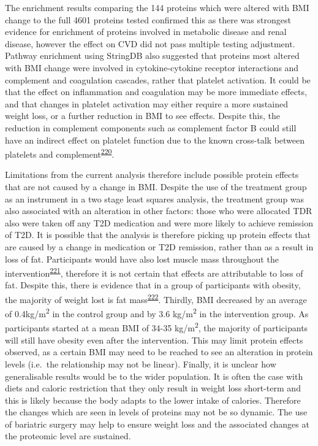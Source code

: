\documentclass[11pt,twoside]{bristolthesis}
\begin{document}
The enrichment results comparing the 144 proteins which were altered with BMI change to the full 4601 proteins tested confirmed this as there was strongest evidence for enrichment of proteins involved in metabolic disease and renal disease, however the effect on CVD did not pass multiple testing adjustment. Pathway enrichment using StringDB also suggested that proteins most altered with BMI change were involved in cytokine-cytokine receptor interactions and complement and coagulation cascades, rather that platelet activation. It could be that the effect on inflammation and coagulation may be more immediate effects, and that changes in platelet activation may either require a more sustained weight loss, or a further reduction in BMI to see effects. Despite this, the reduction in complement components such as complement factor B could still have an indirect effect on platelet function due to the known cross-talk between platelets and complement\textsuperscript{\protect\hyperlink{ref-Peerschke2008}{220}}.

Limitations from the current analysis therefore include possible protein effects that are not caused by a change in BMI. Despite the use of the treatment group as an instrument in a two stage least squares analysis, the treatment group was also associated with an alteration in other factors: those who were allocated TDR also were taken off any T2D medication and were more likely to achieve remission of T2D. It is possible that the analysis is therefore picking up protein effects that are caused by a change in medication or T2D remission, rather than as a result in loss of fat. Participants would have also lost muscle mass throughout the intervention\textsuperscript{\protect\hyperlink{ref-Santanasto2011}{221}}, therefore it is not certain that effects are attributable to loss of fat. Despite this, there is evidence that in a group of participants with obesity, the majority of weight lost is fat mass\textsuperscript{\protect\hyperlink{ref-Backx2016}{222}}. Thirdly, BMI decreased by an average of 0.4kg/m\textsuperscript{2} in the control group and by 3.6 kg/m\textsuperscript{2} in the intervention group. As participants started at a mean BMI of 34-35 kg/m\textsuperscript{2}, the majority of participants will still have obesity even after the intervention. This may limit protein effects observed, as a certain BMI may need to be reached to see an alteration in protein levels (i.e.~the relationship may not be linear). Finally, it is unclear how generalisable results would be to the wider population. It is often the case with diets and caloric restriction that they only result in weight loss short-term and this is likely because the body adapts to the lower intake of calories. Therefore the changes which are seen in levels of proteins may not be so dynamic. The use of bariatric surgery may help to ensure weight loss and the associated changes at the proteomic level are sustained.
\end{document}

